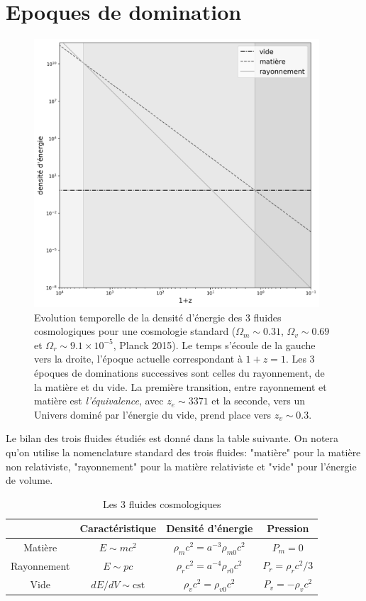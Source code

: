 \section{Epoques de domination}
\begin{figure}[htbp]
	\centering
		\includegraphics[height=10cm]{figs/era.png}
	\caption[Epoques de domination des fluides cosmiques]{Evolution temporelle de la densité d'énergie des 3 fluides cosmologiques pour une cosmologie standard ($\Omega_m \sim 0.31$, $\Omega_v \sim 0.69$ et $\Omega_r\sim 9.1\times 10^{-5}$, Planck 2015). Le temps s'écoule de la gauche vers la droite, l'époque actuelle correspondant à $1+z=1$. Les 3 époques de dominations successives sont celles du rayonnement, de la matière et du vide. La première transition, entre rayonnement et matière est \textit{ l'équivalence}, avec $z_e\sim 3371$ et la seconde, vers un Univers dominé par l'énergie du vide, prend place vers $z_v \sim 0.3$. }
	\label{f:era}
\end{figure}
Le bilan des trois fluides étudiés est donné dans la table suivante. On notera qu'on utilise la nomenclature standard des trois fluides: "matière" pour la matière non relativiste, "rayonnement" pour la matière relativiste et "vide" pour l'énergie de volume.
\begin{table}[h]
\begin{center}
\begin{tabular}{|c|c|c|c|}
\hline 
 & Caractéristique & Densité d'énergie & Pression \\ 
\hline 
Matière & $E\sim mc^2$ & $\rho_mc^2 =a^{-3}\rho_{m0}c^2$& $P_m=0$\\ 
\hline 
Rayonnement & $E\sim pc$ & $\rho_rc^2 =a^{-4}\rho_{r0}c^2$ & $P_r=\rho_rc^2/3$ \\ 
\hline 
Vide & $dE/dV\sim \mathrm{cst}$ & $\rho_vc^2 =\rho_{v0}c^2$ & $P_v=-\rho_vc^2$ \\ 
\hline 
\end{tabular} 
\end{center}
\caption{Les 3 fluides cosmologiques}
\end{table}

